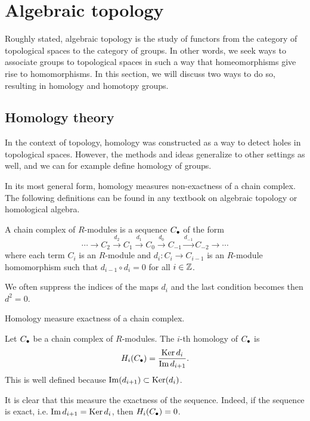 \section*{Algebraic topology}

Roughly stated, algebraic topology is the study of functors from the category of topological spaces to the category of groups.
In other words, we seek ways to associate groups to topological spaces in such a way that homeomorphisms give rise to homomorphisms.
In this section, we will discuss two ways to do so, resulting in homology and homotopy groups.

\subsection*{Homology theory}

In the context of topology, homology was constructed as a way to detect holes in topological spaces.
However, the methods and ideas generalize to other settings as well, and we can for example define homology of groups.

In its most general form, homology measures non-exactness of a chain complex.
The following definitions can be found in any textbook on algebraic topology or homological algebra.

\begin{definition}
    A chain complex of $R$-modules is a sequence $C_\bullet$ of the form
    \[
    \cdots \to  C_2 \xrightarrow{d_2}  C_1 \xrightarrow{d_1} C_0 \xrightarrow{d_0} C_{-1} \xrightarrow{d_{-1}}   C_{-2} \to  \cdots
    \] 
    where each term $C_i$ is an $R$-module and $d_i: C_i \to  C_{i-1}$ is an $R$-module homomorphism such that $d_{i-1}  \circ  d_i = 0$  for all $i \in \mathbb{Z}$.
\end{definition}
We often suppress the indices of the maps $d_i$ and the last condition becomes then  $d^2 = 0$.

\begin{marginfigure}
    \centering
    \caption{Homology measure exactness of a chain complex.}
    \label{fig:homology-definition}
\end{marginfigure}

\begin{definition}[Homology]
    Let $C_\bullet$ be a chain complex of  $R$-modules. The $i$-th homology of $C_\bullet$ is
     \[
         H_i(C_\bullet) = \frac{\operatorname{Ker} d_i}{\operatorname{Im} d_{i+1}}
    .\] 
    This is well defined because $\operatorname{Im}(d_{i+1}) \subset \operatorname{Ker} (d_i)$.
\end{definition}
It is clear that this measure the exactness of the sequence. Indeed, if the sequence is exact, i.e. $\operatorname{Im} d_{i+1} = \operatorname{Ker} d_i$, then $H_i(C_\bullet) = 0$.

